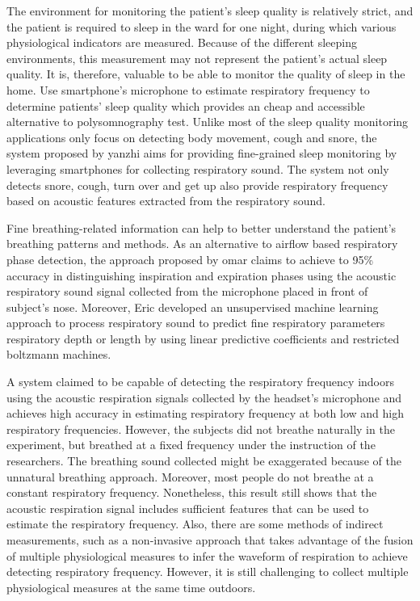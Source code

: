 The environment for monitoring the patient's sleep quality is relatively strict, and the patient is required to sleep in the ward for one night, during which various physiological indicators are measured. Because of the different sleeping environments, this measurement may not represent the patient's actual sleep quality. It is, therefore, valuable to be able to monitor the quality of sleep in the home. Use smartphone’s microphone to estimate respiratory frequency to determine patients’ sleep quality which provides an cheap and accessible alternative to polysomnography test.\cite{Kaur2017UseRespiration} Unlike most of the sleep quality monitoring applications only focus on detecting body movement, cough and snore, the system proposed by yanzhi aims for providing fine-grained sleep monitoring by leveraging smartphones for collecting respiratory sound. The system not only detects snore, cough, turn over and get up also provide respiratory frequency based on acoustic features extracted from the respiratory sound.\cite{Ren2015Fine-grainedSmartphones}

Fine breathing-related information can help to better understand the patient's breathing patterns and methods. As an alternative to airflow based respiratory phase detection, the approach proposed by omar claims to achieve to 95\% accuracy in distinguishing inspiration and expiration phases using the acoustic respiratory sound signal collected from the microphone placed in front of subject’s nose.\cite{Yahya2014AutomaticCycles} Moreover, Eric developed an unsupervised machine learning approach to process respiratory sound to predict fine respiratory parameters respiratory depth or length by using linear predictive coefficients and restricted boltzmann machines. \cite{Hamke2019DetectingMachines}

A system claimed to be capable of detecting the respiratory frequency indoors using the acoustic respiration signals collected by the headset’s microphone and achieves high accuracy in estimating respiratory frequency at both low and high respiratory frequencies.\cite{Nam2016EstimationHeadset} However, the subjects did not breathe naturally in the experiment, but breathed at a fixed frequency under the instruction of the researchers. The breathing sound collected might be exaggerated because of the unnatural breathing approach. Moreover, most people do not breathe at a constant respiratory frequency. Nonetheless, this result still shows that the acoustic respiration signal includes sufficient features that can be used to estimate the respiratory frequency. Also, there are some methods of indirect measurements, such as a non-invasive approach that takes advantage of the fusion of multiple physiological measures to infer the waveform of respiration to achieve detecting respiratory frequency.\cite{Mason2002SignalMonitoring} However, it is still challenging to collect multiple physiological measures at the same time outdoors.

